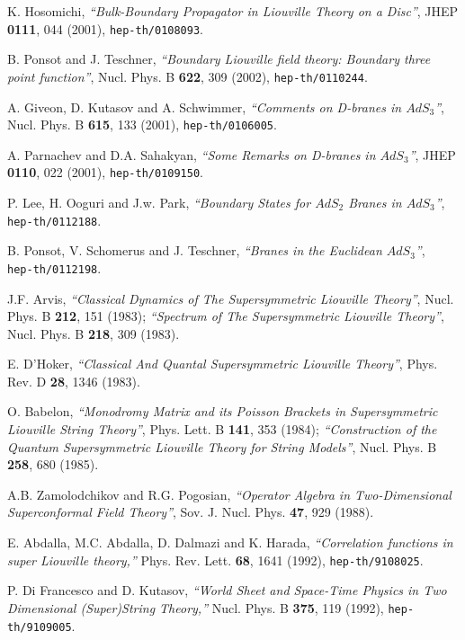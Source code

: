 \documentclass[a4paper,12pt]{article}
\begin{document}
 K. Hosomichi,
    {\sl ``Bulk-Boundary Propagator in Liouville Theory on a Disc''},
    JHEP {\bf 0111}, 044 (2001),
    {\tt hep-th/0108093}.

 B. Ponsot and J. Teschner,
    {\sl ``Boundary Liouville field theory: Boundary three point function''},
    Nucl. Phys. B {\bf 622}, 309 (2002),
    {\tt hep-th/0110244}.

 A. Giveon, D. Kutasov and A. Schwimmer,
    {\sl ``Comments on D-branes in $AdS_3$''},
    Nucl. Phys. B {\bf 615}, 133 (2001),
    {\tt hep-th/0106005}.

 A. Parnachev and D.A. Sahakyan,
    {\sl ``Some Remarks on D-branes in $AdS_3$''},
    JHEP {\bf 0110}, 022 (2001),
    {\tt hep-th/0109150}.

 P. Lee, H. Ooguri and J.w. Park,
    {\sl ``Boundary States for $AdS_2$ Branes in $AdS_3$''},\\
    {\tt hep-th/0112188}.

 B. Ponsot, V. Schomerus and J. Teschner,
    {\sl ``Branes in the Euclidean $AdS_3$''},\\
    {\tt hep-th/0112198}.

 J.F. Arvis,
    {\sl ``Classical Dynamics of The Supersymmetric Liouville Theory''},
    Nucl. Phys. B {\bf 212}, 151 (1983);
    {\sl ``Spectrum of The Supersymmetric Liouville Theory''},
    Nucl. Phys. B {\bf 218}, 309 (1983).

 E. D'Hoker,
    {\sl ``Classical And Quantal Supersymmetric Liouville Theory''},
    Phys. Rev. D {\bf 28}, 1346 (1983).

 O. Babelon,
    {\sl ``Monodromy Matrix and its Poisson Brackets
           in Supersymmetric Liouville String Theory''},
    Phys. Lett. B {\bf 141}, 353 (1984);
    {\sl ``Construction of the Quantum Supersymmetric Liouville Theory
           for String Models''},
    Nucl. Phys. B {\bf 258}, 680 (1985).

 A.B. Zamolodchikov and R.G. Pogosian,
    {\sl ``Operator Algebra in Two-Dimensional Superconformal Field Theory''},
    Sov. J. Nucl. Phys. {\bf 47}, 929 (1988).

 E. Abdalla, M.C. Abdalla, D. Dalmazi and K. Harada,
    {\sl ``Correlation functions in super Liouville theory,''}
    Phys. Rev. Lett. {\bf 68}, 1641 (1992),
    {\tt hep-th/9108025}.

 P. Di Francesco and D. Kutasov,
    {\sl ``World Sheet and Space-Time Physics
           in Two Dimensional (Super)String Theory,''}
    Nucl. Phys. B {\bf 375}, 119 (1992),
    {\tt hep-th/9109005}.
\end{document}
